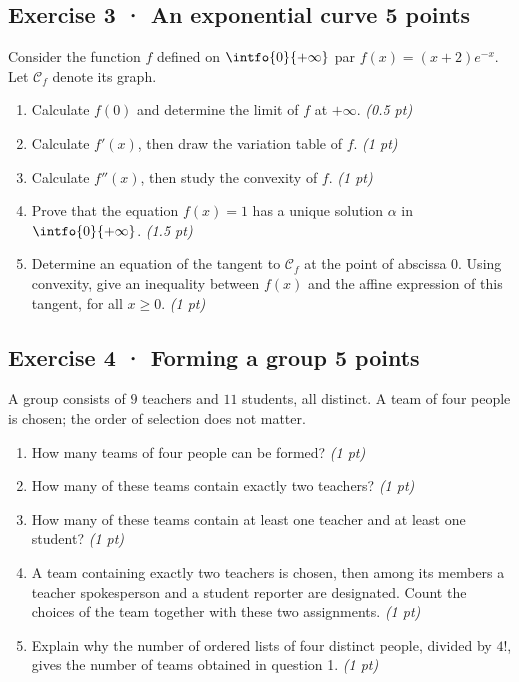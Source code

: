 \mxnewpage{}

\subsection*{Exercise 3 · An exponential curve \hfill 5 points}Consider the function $f$ defined on $\intfo{0}{+\infty}$ par $f(x)=(x+2)e^{-x}$. Let $\mathcal C_f$ denote its graph.

\begin{enumerate}

\item Calculate $f(0)$ and determine the limit of $f$ at $+\infty$. \hfill\textit{(0.5 pt)}

\item Calculate $f' (x)$, then draw the variation table of $f$. \hfill\textit{(1 pt)}

\item Calculate $f'' (x)$, then study the convexity of $f$. \hfill\textit{(1 pt)}

\item Prove that the equation $f(x)=1$ has a unique solution $\alpha$ in $\intfo{0}{+\infty}$. \hfill\textit{(1.5 pt)}

\item Determine an equation of the tangent to $\mathcal C_f$ at the point of abscissa $0$. Using convexity, give an inequality between $f(x)$ and the affine expression of this tangent, for all $x\ge0$. \hfill\textit{(1 pt)}

\end{enumerate}

\subsection*{Exercise 4 · Forming a group \hfill 5 points}A group consists of $9$ teachers and $11$ students, all distinct. A team of four people is chosen; the order of selection does not matter.

\begin{enumerate}

\item How many teams of four people can be formed? \hfill\textit{(1 pt)}

\item How many of these teams contain exactly two teachers? \hfill\textit{(1 pt)}

\item How many of these teams contain at least one teacher and at least one student? \hfill\textit{(1 pt)}

\item A team containing exactly two teachers is chosen, then among its members a teacher spokesperson and a student reporter are designated. Count the choices of the team together with these two assignments. \hfill\textit{(1 pt)}

\item Explain why the number of ordered lists of four distinct people, divided by $4!$, gives the number of teams obtained in question 1. \hfill\textit{(1 pt)}

\end{enumerate}

